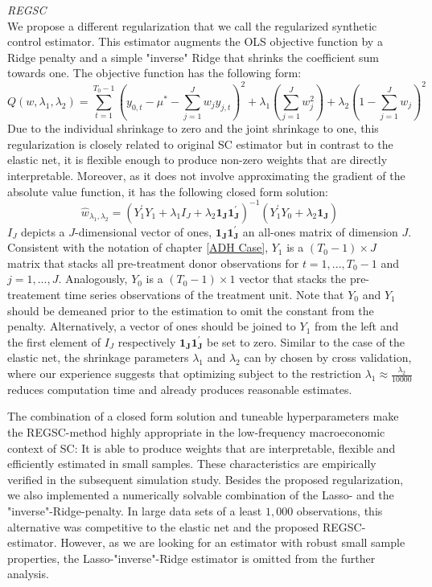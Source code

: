 \textit{\ac{REGSC}} \\
We propose a different regularization that we call the regularized synthetic control estimator. This estimator augments the \ac{OLS} objective function by a Ridge penalty and a simple "inverse" Ridge that shrinks the coefficient sum towards one. The objective function has the following form:
\begin{equation*}
	Q(w, \lambda_1, \lambda_2) = \sum_{t=1}^{T_0-1}\left(y_{0,t} - \mu^* - \sum_{j = 1}^{J} w_j y_{j,t} \right)^2 + 
	\lambda_1 \left( \sum_{j = 1}^{J} w_j^2 \right) + 
	\lambda_2 \left(1- \sum_{j = 1}^{J} w_j
	\right)^2  
\end{equation*}
Due to the individual shrinkage to zero and the joint shrinkage to one, this regularization is closely related to original \ac{SC} estimator but in contrast to the elastic net, it is flexible enough to produce non-zero weights that are directly interpretable. Moreover, as it does not involve approximating the gradient of the absolute value function, it has the following closed form solution:
 \begin{equation*}
 	\widehat{w}_{\lambda_1, \lambda_2} = (Y_1^\prime Y_1 + \lambda_1 I_J + \lambda_2 \boldsymbol{1_J} \boldsymbol{1_J^\prime})^{-1} (Y_1^\prime Y_0 + \lambda_2 \boldsymbol{1_J})
 \end{equation*}
$I_J$ depicts a $J$-dimensional vector of ones, $\boldsymbol{1_J} \boldsymbol{1_J^\prime}$ an all-ones matrix of dimension $J$. Consistent with the notation of chapter \ref{ADH Case}, $Y_1$ is a $(T_0-1)\times J$ matrix that stacks all pre-treatment donor observations for $t = 1, ..., T_0-1$ and $j = 1,...,J$. Analogously, $Y_0$ is a $(T_0-1)\times 1$ vector that stacks the pre-treatement time series observations of the treatment unit. Note that $Y_0$ and $Y_1$ should be demeaned prior to the estimation to omit the constant from the penalty. Alternatively, a vector of ones should be joined to $Y_1$ from the left and the first element of $I_J$ respectively $\boldsymbol{1_J} \boldsymbol{1_J^\prime}$ be set to zero. Similar to the case of the elastic net, the shrinkage parameters $\lambda_1$ and $\lambda_2$ can by chosen by cross validation, where our experience suggests that optimizing subject to the restriction $\lambda_1 \approx \frac{\lambda_2}{10000}$ reduces computation time and already produces reasonable estimates. 

The combination of a closed form solution and tuneable hyperparameters make the \ac{REGSC}-method highly appropriate in the low-frequency macroeconomic context of \ac{SC}: It is able to produce weights that are interpretable, flexible and efficiently estimated in small samples. These characteristics are empirically verified in the subsequent simulation study. Besides the proposed regularization, we also implemented a numerically solvable combination of the Lasso- and the "inverse"-Ridge-penalty. In large data sets of a least $1,000$ observations, this alternative was competitive to the elastic net and the proposed \ac{REGSC}-estimator. However, as we are looking for an estimator with robust small sample properties, the Lasso-"inverse"-Ridge estimator is omitted from the further analysis.

